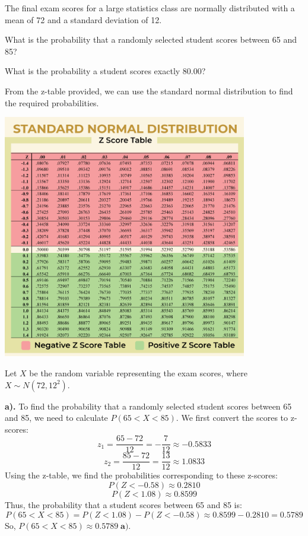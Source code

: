 \documentclass[a4paper, 10pt]{article}
\begin{document}
\begin{tosubmit}
\problem
The final exam scores for a large statistics class are normally distributed with a
mean of 72 and a standard deviation of 12.
\begin{subproblems}
    \item What is the probability that a randomly selected student scores between 65 and 85?
    \item What is the probability a student scores exactly 80.00?
\end{subproblems}

\par\noindent\submitsolution
From the z-table provided, we can use the standard normal distribution to find the required probabilities.
\begin{center}
    \includegraphics[width=0.80\textwidth]{Images/z-score.png}
\end{center}

Let \( X \) be the random variable representing the exam scores, where \( X \sim N(72, 12^2) \).

\vspace{2mm}

\textbf{a).} To find the probability that a randomly selected student scores between 65 and 85, we need to calculate \( P(65 < X < 85) \).
We first convert the scores to z-scores:
\[ z_1 = \frac{65 - 72}{12} = -\frac{7}{12} \approx -0.5833 \]
\[ z_2 = \frac{85 - 72}{12} = \frac{13}{12} \approx 1.0833 \]
Using the z-table, we find the probabilities corresponding to these z-scores:
\[ P(Z < -0.58) \approx 0.2810 \]
\[ P(Z < 1.08) \approx 0.8599 \]
Thus, the probability that a student scores between 65 and 85 is:
\[ P(65 < X < 85) = P(Z < 1.08) - P(Z < -0.58) \approx 0.8599 - 0.2810 = 0.5789 \]
So, \( P(65 < X < 85) \approx \boxed{0.5789} \; \textbf{a).} \)
\end{tosubmit}
\end{document}

